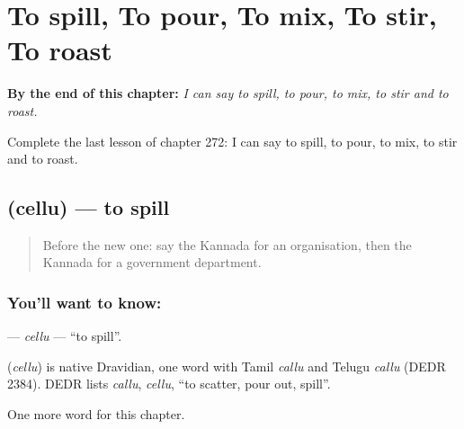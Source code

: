 
\chapter{To spill, To pour, To mix, To stir, To roast}
\label{ch:ka-to-spill-to-pour-to-mix-to-stir-to-roast}

\begin{chapteropening}
\textbf{By the end of this chapter:} \emph{I can say to spill, to pour, to mix, to stir and to roast.}

Complete the last lesson of chapter 272: I can say to spill, to pour, to mix, to stir and to roast.
\end{chapteropening}

\section[\texorpdfstring{\kn{ಚೆಲ್ಲು} (cellu)}{ಚೆಲ್ಲು (cellu)}]{ (cellu) — to spill}

\label{lesson:KA-C272-cellu}



\begin{quote}
Before the new one: say the Kannada for an organisation, then the Kannada for a government department.
\end{quote}

\subsection*{You'll want to know: }
\textbf{} — \emph{cellu} — \textquotedblleft{}to spill\textquotedblright{}.

\begin{cousinweb}
\textbf{} (\emph{cellu}) is native Dravidian, one word with Tamil \emph{callu} and Telugu \emph{callu} (DEDR 2384). DEDR lists \emph{callu}, \emph{cellu}, \textquotedblleft{}to scatter, pour out, spill\textquotedblright{}.
\end{cousinweb}

\begin{grammarlens}[title={What you've built}]
One more word for this chapter.
\end{grammarlens}

